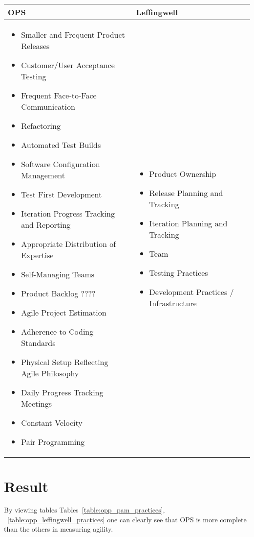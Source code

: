 \label{table:opp_pam_practices}


\begin{tabular}{| p{7.5cm} | p{7cm} |}
	\hline
	\textbf{OPS} & \textbf{Leffingwell}  \\ \hline
     	\begin{itemize}
     		\item {\color{green4}Smaller and Frequent Product Releases} 
     		\item {\color{RoyalBlue1}Customer/User Acceptance Testing}
     		\item {\color{DarkRed}Frequent Face-to-Face Communication} 
     		\item {\color{DarkMagenta}Refactoring}
     		\item {\color{DarkOrange1}Automated Test Builds} 
     		\item {\color{DarkMagenta}Software Configuration Management} 
     		\item {\color{DarkOrange1}Test First Development}
     		\item {\color{RoyalBlue1}Iteration Progress Tracking and Reporting} 
     		\item {\color{DarkRed}Appropriate Distribution of Expertise}
     		\item {\color{DarkRed}Self-Managing} {\color{RoyalBlue1}Teams}
     		\item Product Backlog ????
     		\item {\color{RoyalBlue1}Agile Project Estimation}
     		\item {\color{DarkMagenta}Adherence to Coding Standards} 
     		\item {\color{DarkRed}Physical Setup Reflecting Agile Philosophy}
     		\item {\color{DarkRed}Daily Progress Tracking Meetings}
     		\item {\color{RoyalBlue1}Constant Velocity}
     		\item {\color{DarkMagenta}Pair Programming}
     	\end{itemize} 
     	& \begin{itemize} 
     		\item Product Ownership 
     		\item {\color{green4}Release Planning and Tracking}
     		\item {\color{RoyalBlue1}Iteration Planning and Tracking} 
     		\item {\color{DarkRed}Team}
     		\item {\color{DarkOrange1}Testing Practices}
     		\item {\color{DarkMagenta}Development Practices / Infrastructure}  	
 		\end{itemize} 
     \\ \hline
\end{tabular}
\label{table:opp_leffingwell_practices}

\section{Result}
By viewing tables Tables~\ref{table:opp_pam_practices}, ~\ref{table:opp_leffingwell_practices} one can clearly see that OPS is more complete than the others in measuring agility.